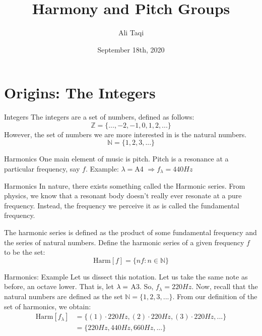 \documentclass[usenames,dvipsnames]{beamer}
\title{Harmony and Pitch Groups}
\date{September 18th, 2020}
\author{Ali Taqi}
\institute{Reed Student Colloquium}
\begin{document}
  \maketitle
  \section{Origins: The Integers}
  \begin{frame}{Integers}
  The integers are a set of numbers, defined as follows: \newline
  $$\mathbb{Z} = \{...,-2,-1,0,1,2,...\}$$
  \newline
  However, the set of numbers we are more interested in is the natural numbers. \newline
  $$\mathbb{N} = \{1,2,3,...\}$$
  \end{frame}

  \begin{frame}{Harmonics}
  One main element of music is pitch. Pitch is a resonance at a particular frequency, say $f$. \newline
  Example: $\lambda = $A4 $\Rightarrow f_\lambda = 440Hz$ \newline
  \end{frame}
    \begin{frame}{Harmonics}
  In nature, there exists something called the Harmonic series. From physics, we know that a resonant body doesn't really ever resonate at a pure frequency. Instead, the frequency we perceive it as is called the fundamental frequency. 
  
  The harmonic series is defined as the product of some fundamental frequency and the series of natural numbers. Define the harmonic series of a given frequency $f$ to be the set:\newline 
  $$\text{Harm}[f] = \{nf : n \in \mathbb{N}\}$$
  \end{frame}
      \begin{frame}{Harmonics: Example}
      Let us dissect this notation. Let us take the same note as before, an octave lower. That is, let $\lambda = \space$ A3. So, $f_\lambda = 220Hz$. Now, recall that the natural numbers are defined as the set $\mathbb{N} = \{1,2,3,...\}$. From our definition of the set of harmonics, we obtain:
  \begin{align*}
  \text{Harm}[f_\lambda] &= \{(1)\cdot220Hz, (2)\cdot220Hz, (3)\cdot220Hz, ...\} \\
  &= \{220Hz, 440Hz, 660Hz, ...\}
  \end{align*}
      \end{frame}
\end{document}
